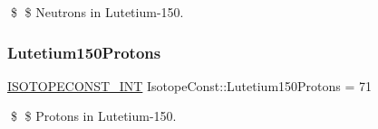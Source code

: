 \$ \$ Neutrons in Lutetium-\/150. \mbox{\label{group___isotope_const-_lutetium-_lu150_ga98659f94cfe65d69b218bcfa981c9f98}} 
\subsubsection{\texorpdfstring{Lutetium150\+Protons}{Lutetium150Protons}}
{\footnotesize\ttfamily \mbox{\hyperlink{group___isotope_const-_macros_ga5f18360b3e99483a35c32d789e62621c}{I\+S\+O\+T\+O\+P\+E\+C\+O\+N\+S\+T\+\_\+\+I\+NT}} Isotope\+Const\+::\+Lutetium150\+Protons = 71}

\$ \$ Protons in Lutetium-\/150. 